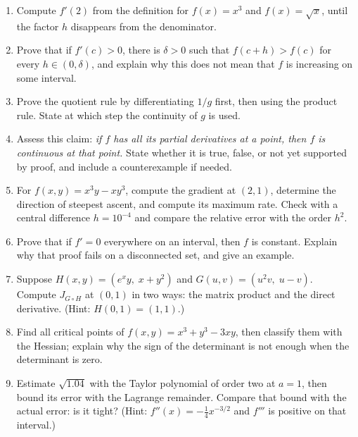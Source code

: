 \begin{latihan}
\begin{enumerate}
  \item Compute $f'(2)$ from the definition for $f(x)=x^{3}$ and $f(x)=\sqrt{x}$, until the
        factor $h$ disappears from the denominator.

  \item Prove that if $f'(c)>0$, there is $\delta>0$ such that $f(c+h)>f(c)$ for every
        $h\in(0,\delta)$, and explain why this does not mean that $f$ is increasing on some
        interval.

  \item Prove the quotient rule by differentiating $1/g$ first, then using the product rule.
        State at which step the continuity of $g$ is used.

  \item Assess this claim: \emph{if $f$ has all its partial derivatives at a point, then $f$
        is continuous at that point.} State whether it is true, false, or not yet supported by
        proof, and include a counterexample if needed.

  \item For $f(x,y)=x^{3}y-xy^{3}$, compute the gradient at $(2,1)$, determine the direction
        of steepest ascent, and compute its maximum rate. Check with a central difference
        $h=10^{-4}$ and compare the relative error with the order $h^{2}$.

  \item Prove that if $f'=0$ everywhere on an interval, then $f$ is constant. Explain why that
        proof fails on a disconnected set, and give an example.

  \item Suppose $H(x,y)=(e^{x}y,\;x+y^{2})$ and $G(u,v)=(u^{2}v,\;u-v)$. Compute
        $J_{G\circ H}$ at $(0,1)$ in two ways: the matrix product and the direct derivative.
        (Hint: $H(0,1)=(1,1)$.)

  \item Find all critical points of $f(x,y)=x^{3}+y^{3}-3xy$, then classify them with the
        Hessian; explain why the sign of the determinant is not enough when the determinant is
        zero.

  \item Estimate $\sqrt{1.04}$ with the Taylor polynomial of order two at $a=1$, then bound
        its error with the Lagrange remainder. Compare that bound with the actual error: is it tight? (Hint:
        $f''(x)=-\frac14x^{-3/2}$ and $f'''$ is positive on that interval.)
\end{enumerate}
\end{latihan}

